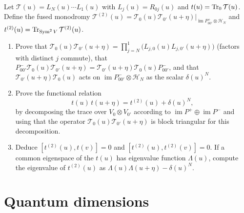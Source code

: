 \begin{exercise}
Let $\mathcal T(u)=L_N(u)\cdots L_1(u)$ with $L_j(u)=R_{0j}(u)$ and
$t(u)=\operatorname{Tr}_0\mathcal T(u)$.  Define the fused monodromy
$\mathcal T^{(2)}(u)=\mathcal T_{0}(u)\mathcal T_{0'}(u+\eta)\big|_{\operatorname{im}P^+_{00'}\otimes\mathcal H_N}$
and $t^{(2)}(u)=\operatorname{Tr}_{\operatorname{Sym}^2V}\mathcal T^{(2)}(u)$.
\begin{enumerate}[label=(\alph*)]
\item Prove that $\mathcal T_0(u)\mathcal T_{0'}(u+\eta)=\prod_{j=N}^{1}\big(L_{j,0}(u)L_{j,0'}(u+\eta)\big)$
(factors with distinct $j$ commute), that
$P^-_{00'}\mathcal T_0(u)\mathcal T_{0'}(u+\eta)=\mathcal T_{0'}(u+\eta)\mathcal T_0(u)P^-_{00'}$,
and that $\mathcal T_{0'}(u+\eta)\mathcal T_0(u)$ acts on
$\operatorname{im}P^-_{00'}\otimes\mathcal H_N$ as the scalar $\delta(u)^N$.
\item Prove the functional relation
\[
 t(u)\,t(u+\eta)=t^{(2)}(u)+\delta(u)^N,
\]
by decomposing the trace over $V_0\otimes V_{0'}$ according to
$\operatorname{im}P^+\oplus\operatorname{im}P^-$ and using that the
operator $\mathcal T_0(u)\mathcal T_{0'}(u+\eta)$ is block triangular for
this decomposition.
\item Deduce $[t^{(2)}(u),t(v)]=0$ and
$[t^{(2)}(u),t^{(2)}(v)]=0$. If a common eigenspace of the
$t(u)$ has eigenvalue function $\Lambda(u)$, compute the
eigenvalue of $t^{(2)}(u)$ as
$\Lambda(u)\Lambda(u+\eta)-\delta(u)^N$.
\end{enumerate}
\end{exercise}

\section{Quantum dimensions}

